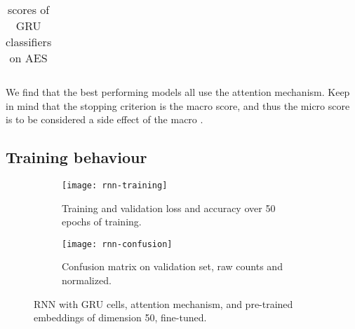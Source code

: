 \begin{table}
\begin{tabular}{lrrrr}
    \bottomrule
  \end{tabular}
  \caption{\FI scores of GRU classifiers on AES}
  \label{tab:gru-results}
\end{table}

We find that the best performing models all use the attention mechanism.
Keep in mind that the stopping criterion is the macro \FI score, and thus
the micro \FI score is to be considered a side effect of the macro \FI.


\subsection{Training behaviour}

\begin{figure}
  \begin{subfigure}{\linewidth}
    \centering
    \texttt{[image: rnn-training]}
    \caption{Training and validation loss and accuracy over 50 epochs of training.}
  \end{subfigure}
  \begin{subfigure}{\linewidth}
    \centering
    \texttt{[image: rnn-confusion]}
    \caption{Confusion matrix on validation set, raw counts and normalized.}
  \end{subfigure}
  \caption{RNN with GRU cells, attention mechanism, and pre-trained embeddings
           of dimension 50, fine-tuned.}
  \label{fig:rnn-training}
\end{figure}

